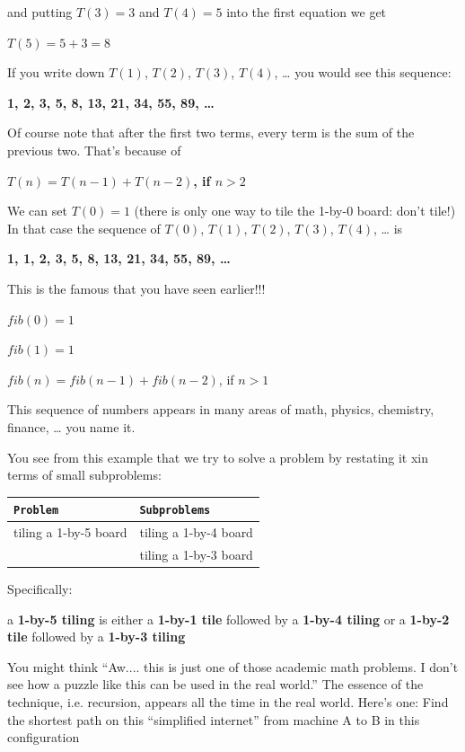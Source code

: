 and putting $T(3) = 3$ and $T(4) = 5$ into the first equation we get

$T(5) = 5 + 3 = 8$



If you write down $T(1)$, $T(2)$, $T(3)$, $T(4)$, \ldots{} you would see this sequence:

\textbf{1, 2, 3, 5, 8, 13, 21, 34, 55, 89, \ldots{}}

Of course note that after the first two terms, every term is the sum of
the previous two. That's because of

\textbf{$T(n) = T(n - 1) + T(n - 2)$, if $n > 2$}

We can set $T(0) = 1$ (there is only one way to tile the 1-by-0 board: don't tile!) In that case the sequence of $T(0)$, $T(1)$, $T(2)$, $T(3)$, $T(4)$, \ldots{} is

\textbf{1, 1, 2, 3, 5, 8, 13, 21, 34, 55, 89, \ldots{}}

This is the famous  that you have seen
earlier!!!

$fib(0) = 1$

$fib(1) = 1$

$fib(n) = fib(n - 1) + fib(n - 2)$, if $n > 1$

This sequence of numbers appears in many areas of math, physics, chemistry, finance, \ldots{} you name it.

You see from this example that we try to solve a problem by restating it xin terms of small subproblems:

\begin{center}
\begin{tabular}{ll}
\texttt{Problem} & \texttt{Subproblems} \\
\hline
tiling a 1-by-5 board & tiling a 1-by-4 board \\
                      & tiling a 1-by-3 board \\
\end{tabular}
\end{center}

Specifically:

a \textbf{1-by-5 tiling} is either a \textbf{1-by-1 tile} followed by a \textbf{1-by-4 tiling} or a \textbf{1-by-2 tile} followed by a \textbf{1-by-3 tiling}


You might think ``Aw.... this is just one of those academic math
problems. I don't see how a puzzle like this can be used
in the real world.'' The essence of the technique, i.e. recursion,
appears all the time in the real world. Here's one: Find
the shortest path on this ``simplified internet'' from machine A to B in
this configuration

